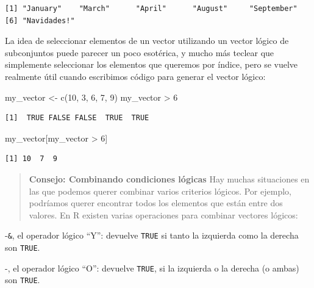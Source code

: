 \documentclass[
  letterpaper,
  DIV=11,
  numbers=noendperiod]{scrreprt}
\newenvironment{Shaded}{\begin{snugshade}}{\end{snugshade}}
\newcommand{\DecValTok}[1]{\textcolor[rgb]{0.68,0.00,0.00}{#1}}
\newcommand{\FunctionTok}[1]{\textcolor[rgb]{0.28,0.35,0.67}{#1}}
\newcommand{\NormalTok}[1]{\textcolor[rgb]{0.00,0.23,0.31}{#1}}
\newcommand{\OtherTok}[1]{\textcolor[rgb]{0.00,0.23,0.31}{#1}}
\newcommand{\SpecialCharTok}[1]{\textcolor[rgb]{0.37,0.37,0.37}{#1}}
\begin{document}
\begin{verbatim}
[1] "January"    "March"      "April"      "August"     "September" 
[6] "Navidades!"
\end{verbatim}

La idea de seleccionar elementos de un vector utilizando un vector
lógico de subconjuntos puede parecer un poco esotérica, y mucho más
teclear que simplemente seleccionar los elementos que queremos por
índice, pero se vuelve realmente útil cuando escribimos código para
generar el vector lógico:

\begin{Shaded}
\begin{Highlighting}[]
\NormalTok{my\_vector }\OtherTok{\textless{}{-}} \FunctionTok{c}\NormalTok{(}\DecValTok{10}\NormalTok{, }\DecValTok{3}\NormalTok{, }\DecValTok{6}\NormalTok{, }\DecValTok{7}\NormalTok{, }\DecValTok{9}\NormalTok{)}
\NormalTok{my\_vector }\SpecialCharTok{\textgreater{}} \DecValTok{6}
\end{Highlighting}
\end{Shaded}

\begin{verbatim}
[1]  TRUE FALSE FALSE  TRUE  TRUE
\end{verbatim}

\begin{Shaded}
\begin{Highlighting}[]
\NormalTok{my\_vector[my\_vector }\SpecialCharTok{\textgreater{}} \DecValTok{6}\NormalTok{]}
\end{Highlighting}
\end{Shaded}

\begin{verbatim}
[1] 10  7  9
\end{verbatim}

\begin{quote}
\textbf{Consejo: Combinando condiciones lógicas} Hay muchas situaciones
en las que podemos querer combinar varios criterios lógicos. Por
ejemplo, podríamos querer encontrar todos los elementos que están entre
dos valores. En R existen varias operaciones para combinar vectores
lógicos:
\end{quote}

-\texttt{\&}, el operador lógico ``Y'': devuelve \texttt{TRUE} si tanto
la izquierda como la derecha son \texttt{TRUE}.

-\texttt{\textbar{}}, el operador lógico ``O'': devuelve \texttt{TRUE},
si la izquierda o la derecha (o ambas) son \texttt{TRUE}.
\end{document}
